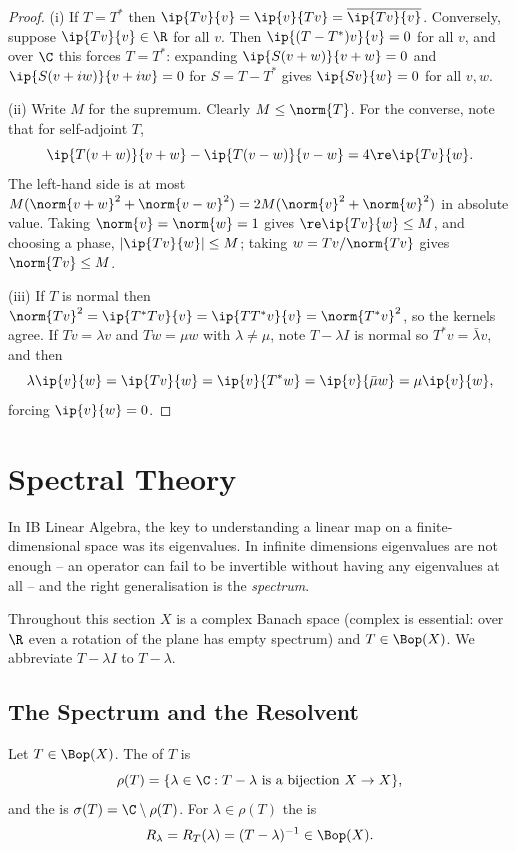 \begin{proof}
	(i) If $T = T^*$ then $\ip{Tv}{v}=\ip{v}{Tv}=\overline{\ip{Tv}{v}}$. Conversely, suppose $\ip{Tv}{v}\in\R$ for all $v$. Then $\ip{(T-T^*)v}{v}=0$ for all $v$, and over $\C$ this forces $T = T^*$: expanding $\ip{S(v+w)}{v+w}=0$ and $\ip{S(v+iw)}{v+iw}=0$ for $S = T-T^*$ gives $\ip{Sv}{w}=0$ for all $v,w$.

	(ii) Write $M$ for the supremum. Clearly $M \leq \norm{T}$. For the converse, note that for self-adjoint $T$,
	$$\ip{T(v+w)}{v+w}-\ip{T(v-w)}{v-w} = 4\re\ip{Tv}{w}.$$
	The left-hand side is at most $M(\norm{v+w}^2+\norm{v-w}^2)=2M(\norm{v}^2+\norm{w}^2)$ in absolute value. Taking $\norm{v}=\norm{w}=1$ gives $\re\ip{Tv}{w}\leq M$, and choosing a phase, $|\ip{Tv}{w}|\leq M$; taking $w = Tv/\norm{Tv}$ gives $\norm{Tv}\leq M$.

	(iii) If $T$ is normal then $\norm{Tv}^2 = \ip{T^*Tv}{v} = \ip{TT^*v}{v} = \norm{T^*v}^2$, so the kernels agree. If $Tv=\lambda v$ and $Tw=\mu w$ with $\lambda \neq \mu$, note $T - \lambda I$ is normal so $T^*v = \bar\lambda v$, and then
	$$\lambda\ip{v}{w} = \ip{Tv}{w}=\ip{v}{T^*w}=\ip{v}{\bar\mu w}=\mu\ip{v}{w},$$
	forcing $\ip{v}{w}=0$.
\end{proof}

\section{Spectral Theory}

In IB Linear Algebra, the key to understanding a linear map on a finite-dimensional space was its eigenvalues. In infinite dimensions eigenvalues are not enough -- an operator can fail to be invertible without having any eigenvalues at all -- and the right generalisation is the \emph{spectrum}.

Throughout this section $X$ is a complex Banach space (complex is essential: over $\R$ even a rotation of the plane has empty spectrum) and $T \in \Bop(X)$. We abbreviate $T - \lambda I$ to $T - \lambda$.

\subsection{The Spectrum and the Resolvent}

\begin{definition}
	Let $T \in \Bop(X)$. The  of $T$ is
	$$\rho(T) = \{ \lambda \in \C : T - \lambda \ \text{is a bijection } X\to X \},$$
	and the  is $\sigma(T) = \C \setminus \rho(T)$. For $\lambda \in \rho(T)$ the  is
	$$R_\lambda = R_T(\lambda) = (T-\lambda)^{-1} \in \Bop(X).$$
\end{definition}

